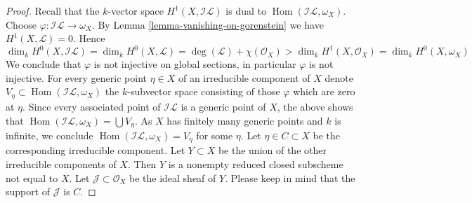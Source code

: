 \documentclass{stacks-project}
\theoremstyle{plain}
\theoremstyle{definition}
\theoremstyle{remark}
\numberwithin{equation}{subsection}
\def\Hom{\mathop{\mathrm{Hom}}\nolimits}
\begin{document}
\begin{proof}
\medskip\noindent
Recall that the $k$-vector space $H^1(X, \mathcal{I}\mathcal{L})$
is dual to $\Hom(\mathcal{I}\mathcal{L}, \omega_X)$.
Choose $\varphi : \mathcal{I}\mathcal{L} \to \omega_X$.
By Lemma \ref{lemma-vanishing-on-gorenstein} we have
$H^1(X, \mathcal{L}) = 0$. Hence
$$
\dim_k H^0(X, \mathcal{I}\mathcal{L}) = \dim_k H^0(X, \mathcal{L}) =
\deg(\mathcal{L}) + \chi(\mathcal{O}_X) > \dim_k H^1(X, \mathcal{O}_X) =
\dim_k H^0(X, \omega_X)
$$
We conclude that $\varphi$ is not injective on global sections, in particular
$\varphi$ is not injective. For every generic point $\eta \in X$
of an irreducible component of $X$ denote
$V_\eta \subset \Hom(\mathcal{I}\mathcal{L}, \omega_X)$ the $k$-subvector
space consisting of those $\varphi$ which are zero at $\eta$.
Since every associated point of $\mathcal{I}\mathcal{L}$
is a generic point of $X$, the above shows that
$\Hom(\mathcal{I}\mathcal{L}, \omega_X) = \bigcup V_\eta$.
As $X$ has finitely many generic points and $k$ is infinite, we conclude
$\Hom(\mathcal{I}\mathcal{L}, \omega_X) = V_\eta$ for some $\eta$.
Let $\eta \in C \subset X$ be the corresponding irreducible component.
Let $Y \subset X$ be the union of the other irreducible components
of $X$. Then $Y$ is a nonempty reduced closed subscheme not equal to $X$.
Let $\mathcal{J} \subset \mathcal{O}_X$ be the ideal sheaf of $Y$.
Please keep in mind that the support of $\mathcal{J}$ is $C$.


\end{proof}
\end{document}
